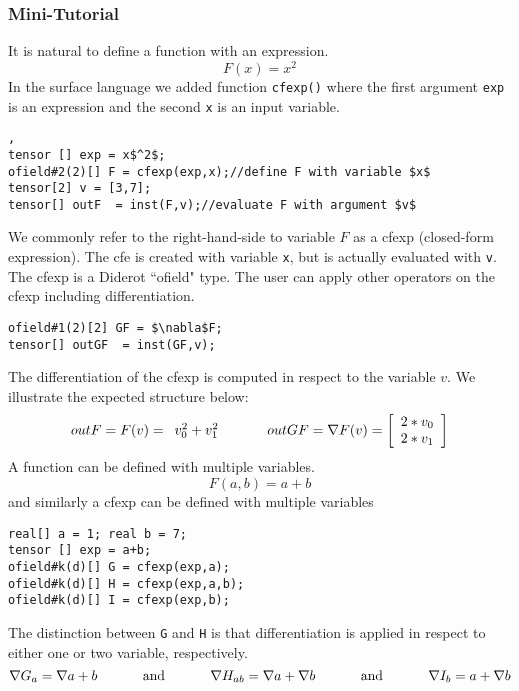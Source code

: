 
\subsubsection{Mini-Tutorial}
It is natural to define a function with an expression. $$F(x) = x^2$$
In the surface language we added function \lstinline[mathescape=true]!cfexp()!
where the first argument \lstinline[mathescape=true]!exp!  is an expression and the second \lstinline[mathescape=true]!x! is an input variable.
\begin{lstlisting}[mathescape=true],
tensor [] exp = x$^2$;
ofield#2(2)[] F = cfexp(exp,x);//define F with variable $x$
tensor[2] v = [3,7];    
tensor[] outF  = inst(F,v);//evaluate F with argument $v$
\end{lstlisting}
We commonly refer to the right-hand-side to variable $F$ as a cfexp (closed-form expression). The cfe is created with variable \lstinline[mathescape=true]!x!, but is actually evaluated with \lstinline[mathescape=true]!v!. The cfexp is a Diderot ``ofield" type. The user can apply other operators on the cfexp including differentiation.
\begin{lstlisting}[mathescape=true]
ofield#1(2)[2] GF = $\nabla$F;
tensor[] outGF  = inst(GF,v);
\end{lstlisting}
The differentiation of the cfexp is computed in respect to the variable $v$.
We illustrate the expected structure below:
\begin{displaymath}
  outF= F(v)= \begin{array}{ll}
   v_0 ^2+  v_1^2  \\
     \end{array}
  \indent\indent
    outGF=   \nabla F(v)=\left[ \begin{array}{ll}
  2*v_0 \\  2*v_1  \\
  \end{array}
 \right] 
 \end{displaymath}
A function can be defined with multiple variables. 
$$F(a,b) =a+b$$
and similarly a cfexp can be defined with multiple variables
\begin{lstlisting}[mathescape=true]
real[] a = 1; real b = 7; 
tensor [] exp = a+b;
ofield#k(d)[] G = cfexp(exp,a);
ofield#k(d)[] H = cfexp(exp,a,b);
ofield#k(d)[] I = cfexp(exp,b);
\end{lstlisting}
The distinction between  \lstinline[mathescape=true]!G! and  \lstinline[mathescape=true]!H! is that differentiation is applied in respect to either one or two variable, respectively.
 \begin{displaymath}
\nabla G_{a}= \nabla a +b     \indent\indent \text{    and    }   
\indent\indent\nabla  H_{ab}= \nabla a +\nabla b  \indent\indent \text{    and    }   
\indent\indent\nabla  I_{b}=   a +\nabla b
 \end{displaymath}

